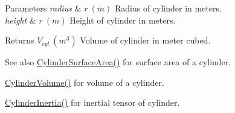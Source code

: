 \begin{DoxyParams}{Parameters}
{\em radius} & $ r\ (m)$ Radius of cylinder in meters. \\
\hline
{\em height} & $ r\ (m)$ Height of cylinder in meters. \\
\hline
\end{DoxyParams}
\begin{DoxyReturn}{Returns}
$ V_{cyl}\ (m^3)$ Volume of cylinder in meter cubed. 
\end{DoxyReturn}
\begin{DoxySeeAlso}{See also}
\mbox{\hyperlink{group___e_g_x_math-_geometry-3_d-_cylinder_gaf14619f5d525e14150a43b9898adb258}{Cylinder\+Surface\+Area()}} for surface area of a cylinder. 

\mbox{\hyperlink{group___e_g_x_math-_geometry-3_d-_cylinder_ga9d1aa08f778f9ccbd79953063f11bc9b}{Cylinder\+Volume()}} for volume of a cylinder. 

\mbox{\hyperlink{group___e_g_x_math-_geometry-3_d-_cylinder_ga5d9256549303e88a49b72e3d4c2c4a6d}{Cylinder\+Inertia()}} for inertial tensor of cylinder. 
\end{DoxySeeAlso}
